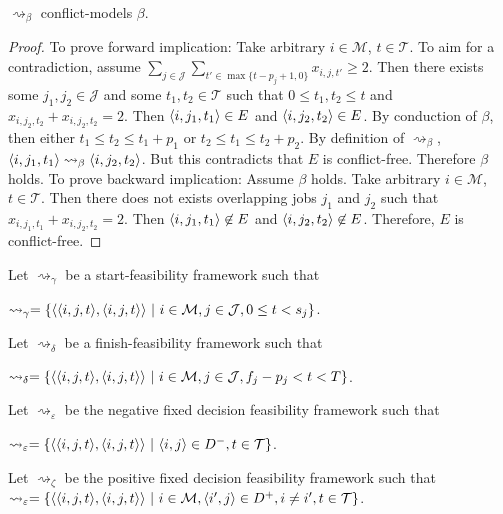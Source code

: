 \begin{lemma}
	\label{conflictfreenessbeta}
	$\rightsquigarrow_\beta$ conflict-models $\beta$.
	
	\begin{proof}
		To prove forward implication: Take arbitrary $i\in\mathcal{M}$, $t\in\mathcal{T}$. To aim for a contradiction, assume $\sum_{j\in\mathcal{J}}\sum_{t'\in\max\{t-p_j+1,0\}}x_{i,j,t'}\geq 2$. Then there exists some $j_1,j_2\in\mathcal{J}$ and some $t_1,t_2\in\mathcal{T}$ such that $0\leq t_1,t_2\leq t$ and $x_{i,j_2,t_2}+x_{i,j_2,t_2}=2$. Then $\langle{i},{j_1},{t_1}\rangle\in E$ and $\langle{i},{j_2},{t_2}\rangle\in E$. By conduction of $\beta$, then either $t_1\leq t_2\leq t_1+p_1$ or $t_2\leq t_1\leq t_2+p_2$. By definition of $\rightsquigarrow_\beta$, $\langle{i},{j_1},{t_1}\rangle\rightsquigarrow_\beta\langle{i},{j_2},{t_2}\rangle$. But this contradicts that $E$ is conflict-free. Therefore $\beta$ holds.
		\linespace
		To prove backward implication: Assume $\beta$ holds. Take arbitrary $i\in\mathcal{M}$, $t\in\mathcal{T}$. Then there does not exists overlapping jobs $j_1$ and $j_2$ such that $x_{i,j_1,t_1}+x_{i,j_2,t_2}=2$. Then $\langle{i},{j_1},{t_1}\rangle\not\in E$ and $\langle{i},{j_2},{t_2}\rangle\not\in E$. Therefore, $E$ is conflict-free.
	\end{proof}
\end{lemma}

\begin{definition}
	Let $\rightsquigarrow_\gamma$ be a start-feasibility framework such that
	
	$\rightsquigarrow_\gamma=\{\pair{\triple{i}{j}{t}}{\triple{i}{j}{t}}\ |\ i\in\mathcal{M},j\in\mathcal{J},0\leq t<s_j\}$.
\end{definition}

\begin{definition}
	Let $\rightsquigarrow_\delta$ be a finish-feasibility framework such that
	
	$\rightsquigarrow_\delta=\{\pair{\triple{i}{j}{t}}{\triple{i}{j}{t}}\ |\ i\in\mathcal{M},j\in\mathcal{J},f_j-p_j<t<T\}$.
\end{definition}

\begin{definition}
	Let $\rightsquigarrow_\varepsilon$ be the negative fixed decision feasibility framework such that
	
	$\rightsquigarrow_\varepsilon=\{\pair{\triple{i}{j}{t}}{\triple{i}{j}{t}}\ |\ \pair{i}{j}\in D^-,t\in\mathcal{T}\}$.
\end{definition}

\begin{definition}
	Let $\rightsquigarrow_\zeta$ be the positive fixed decision feasibility framework such that
	$\rightsquigarrow_\varepsilon=\{\pair{\triple{i}{j}{t}}{\triple{i}{j}{t}}\ |\ i\in\mathcal{M}, \pair{i'}{j}\in D^+, i\neq i', t\in\mathcal{T}\}$.
\end{definition}

